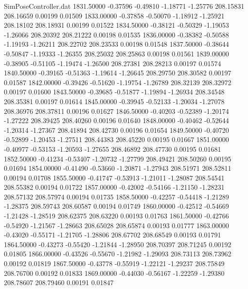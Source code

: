 \begin{filecontents}{SimPoseController.dat}
1831.50000   -0.37596   -0.49810    -1.18771   -1.25776  208.15831  208.16659    0.00199    0.01509
1833.00000   -0.37858   -0.50070    -1.18912   -1.25921  208.18102  208.18931    0.00199    0.01522
1834.50000   -0.38121   -0.50329    -1.19053   -1.26066  208.20392  208.21222    0.00198    0.01535
1836.00000   -0.38382   -0.50588    -1.19193   -1.26211  208.22702  208.23533    0.00198    0.01548
1837.50000   -0.38644   -0.50847    -1.19333   -1.26355  208.25032  208.25863    0.00198    0.01561
1839.00000   -0.38905   -0.51105    -1.19474   -1.26500  208.27381  208.28213    0.00197    0.01574
1840.50000   -0.39165   -0.51363    -1.19614   -1.26645  208.29750  208.30582    0.00197    0.01587
1842.00000   -0.39426   -0.51620    -1.19754   -1.26789  208.32139  208.32972    0.00197    0.01600
1843.50000   -0.39685   -0.51877    -1.19894   -1.26934  208.34548  208.35381    0.00197    0.01614
1845.00000   -0.39945   -0.52133    -1.20034   -1.27078  208.36976  208.37811    0.00196    0.01627
1846.50000   -0.40203   -0.52389    -1.20174   -1.27222  208.39425  208.40260    0.00196    0.01640
1848.00000   -0.40462   -0.52644    -1.20314   -1.27367  208.41894  208.42730    0.00196    0.01654
1849.50000   -0.40720   -0.52899    -1.20453   -1.27511  208.44383  208.45220    0.00195    0.01667
1851.00000   -0.40977   -0.53153    -1.20593   -1.27655  208.46892  208.47730    0.00195    0.01681
1852.50000   -0.41234   -0.53407    -1.20732   -1.27799  208.49421  208.50260    0.00195    0.01694
1854.00000   -0.41490   -0.53660    -1.20871   -1.27943  208.51971  208.52811    0.00194    0.01708
1855.50000   -0.41747   -0.53913    -1.21011   -1.28087  208.54541  208.55382    0.00194    0.01722
1857.00000   -0.42002   -0.54166    -1.21150   -1.28231  208.57132  208.57974    0.00194    0.01735
1858.50000   -0.42257   -0.54418    -1.21289   -1.28375  208.59743  208.60587    0.00194    0.01749
1860.00000   -0.42512   -0.54669    -1.21428   -1.28519  208.62375  208.63220    0.00193    0.01763
1861.50000   -0.42766   -0.54920    -1.21567   -1.28663  208.65028  208.65874    0.00193    0.01777
1863.00000   -0.43020   -0.55171    -1.21705   -1.28806  208.67702  208.68549    0.00193    0.01791
1864.50000   -0.43273   -0.55420    -1.21844   -1.28950  208.70397  208.71245    0.00192    0.01805
1866.00000   -0.43526   -0.55670    -1.21982   -1.29093  208.73113  208.73962    0.00192    0.01819
1867.50000   -0.43778   -0.55919    -1.22121   -1.29237  208.75849  208.76700    0.00192    0.01833
1869.00000   -0.44030   -0.56167    -1.22259   -1.29380  208.78607  208.79460    0.00191    0.01847

\end{filecontents}
